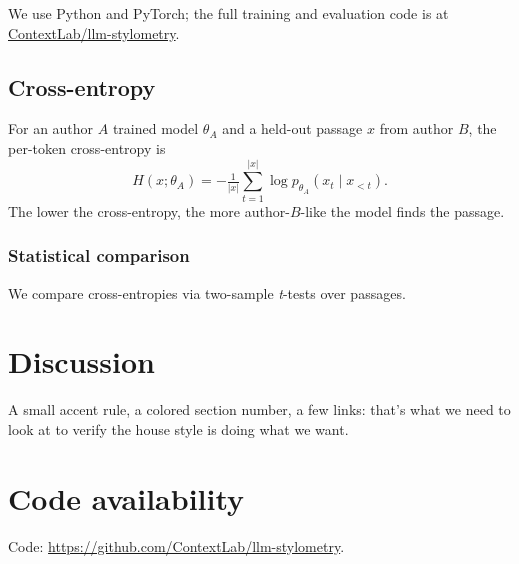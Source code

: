 \documentclass[11pt]{llmxive}
\begin{document}
We use Python and PyTorch; the full training and evaluation code is at
\href{https://github.com/ContextLab/llm-stylometry}{ContextLab/llm-stylometry}.

\subsection{Cross-entropy}
For an author $A$ trained model $\theta_A$ and a held-out passage $x$ from
author $B$, the per-token cross-entropy is
\[
  H(x;\theta_A) = -\tfrac{1}{|x|}\sum_{t=1}^{|x|} \log p_{\theta_A}(x_t \mid x_{<t}).
\]
The lower the cross-entropy, the more author-$B$-like the model finds the
passage.

\subsubsection{Statistical comparison}
We compare cross-entropies via two-sample \emph{t}-tests over passages.

\section*{Discussion}
A small accent rule, a colored section number, a few links: that's what we
need to look at to verify the house style is doing what we want.

\section*{Code availability}
Code: \url{https://github.com/ContextLab/llm-stylometry}.
\end{document}
